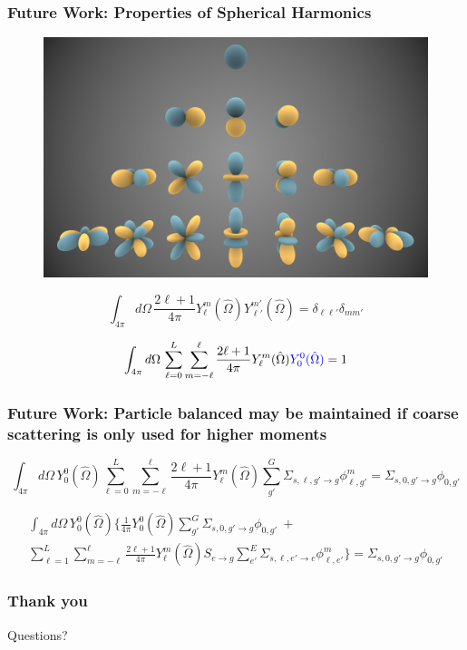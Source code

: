 \documentclass[xcolor=dvipsnames]{beamer}
\begin{document}
\begin{frame}
  \frametitle{Future Work: Properties of Spherical Harmonics}

\begin{figure}[ht]
  \centering
\includegraphics[width=.6\textwidth]{./graphics/Spherical_Harmonics.png}
\end{figure}

\begin{equation*}
\int_{4\pi} d\Omega \, \frac{2\ell + 1}{4\pi} Y_\ell^m(\hat{\Omega}) Y_{\ell'}^{m'}(\hat{\Omega}) =  \delta_{\ell \ell'} \delta_{m m'} 
\end{equation*}


\begin{equation*}
\int_{4\pi} d\Omega \, \sum_{\ell = 0}^L \sum_{m=-\ell}^{\ell} \frac{2\ell + 1}{4\pi}  Y_\ell^m(\hat{\Omega}) \textcolor{blue}{Y_0^0(\hat{\Omega})} = 1
\end{equation*}

\end{frame}

\begin{frame}
  \frametitle{Future Work: Particle balanced may be maintained if coarse scattering is only used for higher moments}

\begin{equation*}
\int_{4\pi} d\Omega \, Y_0^0(\hat{\Omega}) \sum_{\ell = 0}^L \sum_{m = -\ell}^{\ell} \frac{2\ell + 1}{4\pi} Y_\ell^m(\hat{\Omega}) \sum_{g'}^G \Sigma_{s,\ell,g' \to g} \phi_{\ell,g'}^m = \Sigma_{s,0,g' \to g} \phi_{0,g'}
\end{equation*}

\begin{multline*}
\int_{4\pi} d\Omega \, Y_0^0(\hat{\Omega}) \Big\{ \frac{1}{4\pi} Y_0^0(\hat{\Omega}) \sum_{g'}^G \Sigma_{s,0,g' \to g} \phi_{0,g'} \: + \\ \sum_{\ell = 1}^L \sum_{m = -\ell}^{\ell} \frac{2\ell + 1}{4\pi} Y_\ell^m(\hat{\Omega}) S_{e \to g} \sum_{e'}^E \Sigma_{s,\ell,e' \to e} \phi_{\ell,e'}^m \Big\} = \Sigma_{s,0,g' \to g} \phi_{0,g'}
\end{multline*}

\end{frame}





\begin{frame}[noframenumbering]
\frametitle{Thank you}
Questions?
\end{frame}
\end{document}
